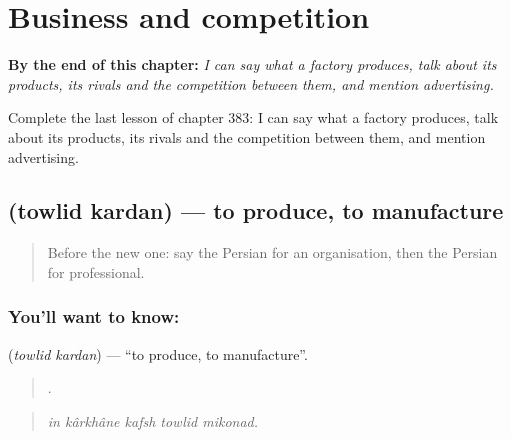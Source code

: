 
\chapter{Business and competition}
\label{ch:fa-business-and-competition}

\begin{chapteropening}
\textbf{By the end of this chapter:} \emph{I can say what a factory produces, talk about its products, its rivals and the competition between them, and mention advertising.}

Complete the last lesson of chapter 383: I can say what a factory produces, talk about its products, its rivals and the competition between them, and mention advertising.
\end{chapteropening}

\section[\texorpdfstring{\fa{تولید} \fa{کردن} (towlid kardan)}{تولید کردن (towlid kardan)}]{  (towlid kardan) — to produce, to manufacture}

\label{lesson:FA-C383-towlid-kardan}



\begin{quote}
Before the new one: say the Persian for an organisation, then the Persian for professional.
\end{quote}

\subsection*{You'll want to know:  }
\textbf{ } (\emph{towlid kardan}) — \textquotedblleft{}to produce, to manufacture\textquotedblright{}.

\begin{quote}
    .
\end{quote}

\begin{quote}
\emph{in kârkhâne kafsh towlid mikonad.}
\end{quote}

